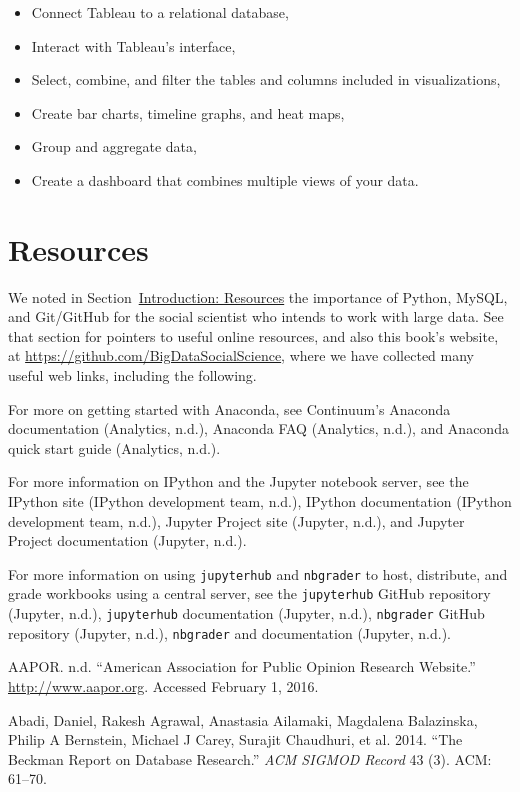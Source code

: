 \documentclass[]{krantz}
\begin{document}
\begin{itemize}
\item
  Connect Tableau to a relational database,
\item
  Interact with Tableau's interface,
\item
  Select, combine, and filter the tables and columns included in
  visualizations,
\item
  Create bar charts, timeline graphs, and heat maps,
\item
  Group and aggregate data,
\item
  Create a dashboard that combines multiple views of your data.
\end{itemize}

\section{Resources}\label{resources-7}

We noted in
Section~\protect\hyperlink{sec:intro:resources}{Introduction: Resources}
the importance of Python, MySQL, and Git/GitHub for the social scientist
who intends to work with large data. See that section for pointers to
useful online resources, and also this book's website, at
\url{https://github.com/BigDataSocialScience}, where we have collected
many useful web links, including the following.

For more on getting started with Anaconda, see Continuum's Anaconda
documentation (Analytics, n.d.), Anaconda FAQ (Analytics, n.d.), and
Anaconda quick start guide (Analytics, n.d.).

For more information on IPython and the Jupyter notebook server, see the
IPython site (IPython development team, n.d.), IPython documentation
(IPython development team, n.d.), Jupyter Project site (Jupyter, n.d.),
and Jupyter Project documentation (Jupyter, n.d.).

For more information on using \texttt{jupyterhub} and \texttt{nbgrader}
to host, distribute, and grade workbooks using a central server, see the
\texttt{jupyterhub} GitHub repository (Jupyter, n.d.),
\texttt{jupyterhub} documentation (Jupyter, n.d.), \texttt{nbgrader}
GitHub repository (Jupyter, n.d.), \texttt{nbgrader} and documentation
(Jupyter, n.d.).

\hypertarget{refs}{}
\hypertarget{ref-aaporWeb}{}
AAPOR. n.d. ``American Association for Public Opinion Research
Website.'' \url{http://www.aapor.org}. Accessed February 1, 2016.

\hypertarget{ref-abadi2014beckman}{}
Abadi, Daniel, Rakesh Agrawal, Anastasia Ailamaki, Magdalena Balazinska,
Philip A Bernstein, Michael J Carey, Surajit Chaudhuri, et al. 2014.
``The Beckman Report on Database Research.'' \emph{ACM SIGMOD Record} 43
(3). ACM: 61--70.
\end{document}

